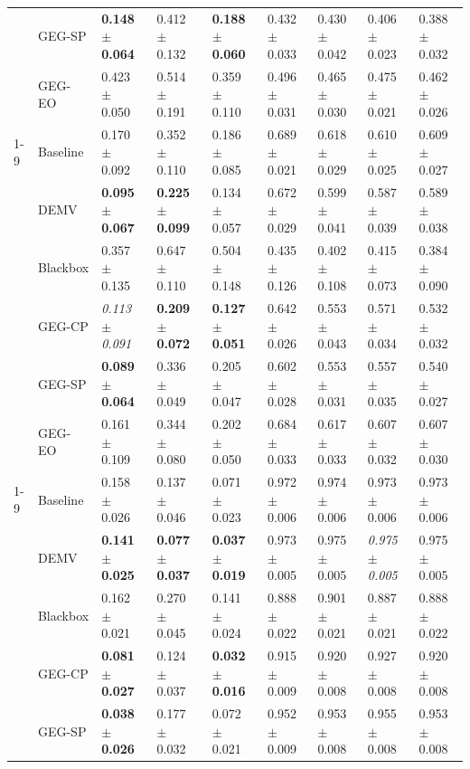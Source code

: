\begin{table}
\begin{tabular}{lllllllll}
 & GEG-SP & \textbf{0.148 $\pm$ 0.064} & 0.412 $\pm$ 0.132 & \textbf{0.188 $\pm$ 0.060} & 0.432 $\pm$ 0.033 & 0.430 $\pm$ 0.042 & 0.406 $\pm$ 0.023 & 0.388 $\pm$ 0.032 \\
 & GEG-EO & 0.423 $\pm$ 0.050 & 0.514 $\pm$ 0.191 & 0.359 $\pm$ 0.110 & 0.496 $\pm$ 0.031 & 0.465 $\pm$ 0.030 & 0.475 $\pm$ 0.021 & 0.462 $\pm$ 0.026 \\
\cline{1-9}
\multirow[t]{6}{*}{drug} & Baseline & 0.170 $\pm$ 0.092 & 0.352 $\pm$ 0.110 & 0.186 $\pm$ 0.085 & 0.689 $\pm$ 0.021 & 0.618 $\pm$ 0.029 & 0.610 $\pm$ 0.025 & 0.609 $\pm$ 0.027 \\
 & DEMV & \textbf{0.095 $\pm$ 0.067} & \textbf{0.225 $\pm$ 0.099} & 0.134 $\pm$ 0.057 & 0.672 $\pm$ 0.029 & 0.599 $\pm$ 0.041 & 0.587 $\pm$ 0.039 & 0.589 $\pm$ 0.038 \\
 & Blackbox & 0.357 $\pm$ 0.135 & 0.647 $\pm$ 0.110 & 0.504 $\pm$ 0.148 & 0.435 $\pm$ 0.126 & 0.402 $\pm$ 0.108 & 0.415 $\pm$ 0.073 & 0.384 $\pm$ 0.090 \\
 & GEG-CP & \textit{0.113 $\pm$ 0.091} & \textbf{0.209 $\pm$ 0.072} & \textbf{0.127 $\pm$ 0.051} & 0.642 $\pm$ 0.026 & 0.553 $\pm$ 0.043 & 0.571 $\pm$ 0.034 & 0.532 $\pm$ 0.032 \\
 & GEG-SP & \textbf{0.089 $\pm$ 0.064} & 0.336 $\pm$ 0.049 & 0.205 $\pm$ 0.047 & 0.602 $\pm$ 0.028 & 0.553 $\pm$ 0.031 & 0.557 $\pm$ 0.035 & 0.540 $\pm$ 0.027 \\
 & GEG-EO & 0.161 $\pm$ 0.109 & 0.344 $\pm$ 0.080 & 0.202 $\pm$ 0.050 & 0.684 $\pm$ 0.033 & 0.617 $\pm$ 0.033 & 0.607 $\pm$ 0.032 & 0.607 $\pm$ 0.030 \\
\cline{1-9}
\multirow[t]{6}{*}{law} & Baseline & 0.158 $\pm$ 0.026 & 0.137 $\pm$ 0.046 & 0.071 $\pm$ 0.023 & 0.972 $\pm$ 0.006 & 0.974 $\pm$ 0.006 & 0.973 $\pm$ 0.006 & 0.973 $\pm$ 0.006 \\
 & DEMV & \textbf{0.141 $\pm$ 0.025} & \textbf{0.077 $\pm$ 0.037} & \textbf{0.037 $\pm$ 0.019} & 0.973 $\pm$ 0.005 & 0.975 $\pm$ 0.005 & \textit{0.975 $\pm$ 0.005} & 0.975 $\pm$ 0.005 \\
 & Blackbox & 0.162 $\pm$ 0.021 & 0.270 $\pm$ 0.045 & 0.141 $\pm$ 0.024 & 0.888 $\pm$ 0.022 & 0.901 $\pm$ 0.021 & 0.887 $\pm$ 0.021 & 0.888 $\pm$ 0.022 \\
 & GEG-CP & \textbf{0.081 $\pm$ 0.027} & 0.124 $\pm$ 0.037 & \textbf{0.032 $\pm$ 0.016} & 0.915 $\pm$ 0.009 & 0.920 $\pm$ 0.008 & 0.927 $\pm$ 0.008 & 0.920 $\pm$ 0.008 \\
 & GEG-SP & \textbf{0.038 $\pm$ 0.026} & 0.177 $\pm$ 0.032 & 0.072 $\pm$ 0.021 & 0.952 $\pm$ 0.009 & 0.953 $\pm$ 0.008 & 0.955 $\pm$ 0.008 & 0.953 $\pm$ 0.008 \\

\end{tabular}
\end{table}
